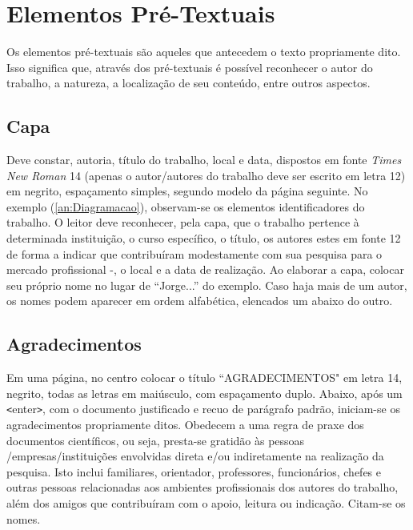 \documentclass[
	12pt,				%
	openright,			%
	oneside,			%
	a4paper,			%
	english,			%
	french,				%
	spanish,			%
	brazil				%
	]{abntex2}
\begin{document}
\chapter{Elementos Pré-Textuais} \label{ch:elementos}

\par Os elementos pré-textuais são aqueles que antecedem o texto propriamente dito. Isso significa que, através dos pré-textuais é possível reconhecer o autor do trabalho, a natureza, a localização de seu conteúdo, entre outros aspectos. 

\section{Capa}
\par Deve constar, autoria, título do trabalho, local e data, dispostos em fonte \textit{Times New Roman} 14 (apenas o autor/autores do trabalho deve ser escrito em letra 12) em negrito, espaçamento simples, segundo modelo da página seguinte. No exemplo (\autoref{an:Diagramacao}), observam-se os elementos identificadores do trabalho. O leitor deve reconhecer, pela capa, que o trabalho pertence à determinada instituição, o curso específico, o título, os autores estes em fonte 12 de forma a indicar que contribuíram modestamente com sua pesquisa para o mercado profissional -, o local e a data de realização. Ao elaborar a capa, colocar seu próprio nome no lugar de ``Jorge...'' do exemplo. Caso haja mais de um autor, os nomes podem aparecer em ordem alfabética, elencados um abaixo do outro.

\section{Agradecimentos}

\par Em uma página, no centro colocar o título ``AGRADECIMENTOS" em letra 14, negrito, todas as letras em maiúsculo, com espaçamento duplo. Abaixo, após um \verb*#<#enter\verb*#>#, com o documento justificado e recuo de parágrafo padrão, iniciam-se os agradecimentos propriamente ditos. Obedecem a uma regra de praxe dos documentos científicos, ou seja, presta-se gratidão às pessoas /empresas/instituições envolvidas direta e/ou indiretamente na realização da pesquisa. Isto inclui familiares, orientador, professores, funcionários, chefes e outras pessoas relacionadas aos ambientes profissionais dos autores do trabalho, além dos amigos que contribuíram com o apoio, leitura ou indicação. Citam-se os nomes.
\end{document}
